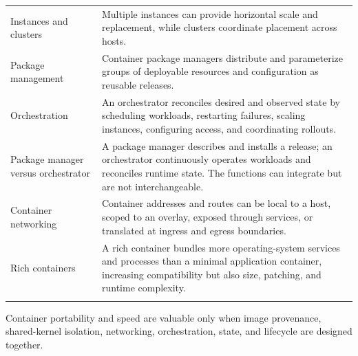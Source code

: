 \documentclass[11pt]{article}
\begin{document}
\begin{longtable}{@{}>{\RaggedRight\arraybackslash}p{}>{\RaggedRight\arraybackslash}p{}@{}}
Instances and clusters & Multiple instances can provide horizontal scale and replacement, while clusters coordinate placement across hosts. \\\addlinespace[2pt]
Package management & Container package managers distribute and parameterize groups of deployable resources and configuration as reusable releases. \\\addlinespace[2pt]
Orchestration & An orchestrator reconciles desired and observed state by scheduling workloads, restarting failures, scaling instances, configuring access, and coordinating rollouts. \\\addlinespace[2pt]
Package manager versus orchestrator & A package manager describes and installs a release; an orchestrator continuously operates workloads and reconciles runtime state. The functions can integrate but are not interchangeable. \\\addlinespace[2pt]
Container networking & Container addresses and routes can be local to a host, scoped to an overlay, exposed through services, or translated at ingress and egress boundaries. \\\addlinespace[2pt]
Rich containers & A rich container bundles more operating-system services and processes than a minimal application container, increasing compatibility but also size, patching, and runtime complexity. \\\addlinespace[2pt]
\bottomrule
\end{longtable}
\begin{takeawaybox}
Container portability and speed are valuable only when image provenance, shared-kernel isolation, networking, orchestration, state, and lifecycle are designed together.
\end{takeawaybox}
\end{document}
